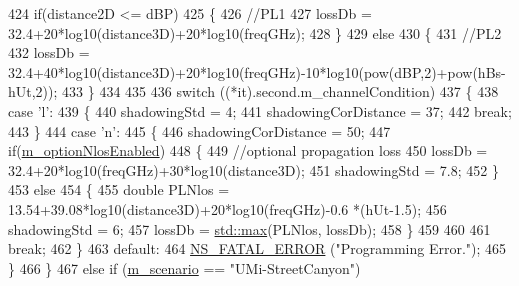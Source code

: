\begin{DoxyCode}
424                 \textcolor{keywordflow}{if}(distance2D <= dBP)
425                 \{
426                         \textcolor{comment}{//PL1}
427                         lossDb = 32.4+20*log10(distance3D)+20*log10(freqGHz);
428                 \}
429                 \textcolor{keywordflow}{else}
430                 \{
431                         \textcolor{comment}{//PL2}
432                         lossDb = 32.4+40*log10(distance3D)+20*log10(freqGHz)-10*log10(pow(dBP,2)+pow(hBs-
      hUt,2));
433                 \}
434 
435 
436                 \textcolor{keywordflow}{switch} ((*it).second.m\_channelCondition)
437                 \{
438                         \textcolor{keywordflow}{case} \textcolor{charliteral}{'l'}:
439                         \{
440                                 shadowingStd = 4;
441                                 shadowingCorDistance = 37;
442                                 \textcolor{keywordflow}{break};
443                         \}
444                         \textcolor{keywordflow}{case} \textcolor{charliteral}{'n'}:
445                         \{
446                                 shadowingCorDistance = 50;
447                                 \textcolor{keywordflow}{if}(\hyperlink{classMmWave3gppPropagationLossModel_a5029858358d3c4dac793ebf3c8c6cc09}{m\_optionNlosEnabled})
448                                 \{
449                                         \textcolor{comment}{//optional propagation loss}
450                                         lossDb = 32.4+20*log10(freqGHz)+30*log10(distance3D);
451                                         shadowingStd = 7.8;
452                                 \}
453                                 \textcolor{keywordflow}{else}
454                                 \{
455                                         \textcolor{keywordtype}{double} PLNlos = 13.54+39.08*log10(distance3D)+20*log10(freqGHz)-0.6
      *(hUt-1.5);
456                                         shadowingStd = 6;
457                                         lossDb = \hyperlink{80211b_8c_affe776513b24d84b39af8ab0930fef7f}{std::max}(PLNlos, lossDb);
458                                 \}
459 
460 
461                                 \textcolor{keywordflow}{break};
462                         \}
463                         \textcolor{keywordflow}{default}:
464                                 \hyperlink{group__fatal_ga5131d5e3f75d7d4cbfd706ac456fdc85}{NS\_FATAL\_ERROR} (\textcolor{stringliteral}{"Programming Error."});
465                 \}
466         \}
467         \textcolor{keywordflow}{else} \textcolor{keywordflow}{if} (\hyperlink{classMmWave3gppPropagationLossModel_a3ba2b9e45f4d02e49620faf03f97e898}{m\_scenario} == \textcolor{stringliteral}{"UMi-StreetCanyon"})

\end{DoxyCode}
